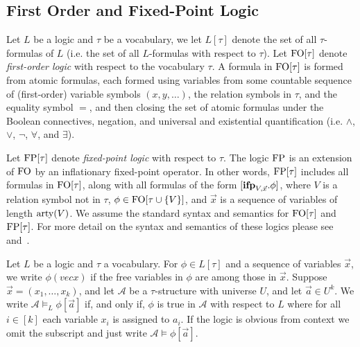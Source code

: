 \documentclass[../paper.tex]{subfiles}
\begin{document}
\subsection{First Order and Fixed-Point Logic}
Let $L$ be a logic and $\tau$ be a vocabulary, we let $L[\tau]$ denote the set
of all $\tau$-formulas of $L$ (i.e. the set of all $L$-formulas with respect to
$\tau$). Let $\text{\upshape FO}[\tau]$ denote \emph{first-order logic} with respect to the
vocabulary $\tau$. A formula in $\text{\upshape FO}[\tau]$ is formed from atomic formulas, each
formed using variables from some countable sequence of (first-order) variable
symbols $(x, y, \ldots)$, the relation symbols in $\tau$, and the equality
symbol $=$, and then closing the set of atomic formulas under the Boolean
connectives, negation, and universal and existential quantification (i.e.
$\land$, $\lor$, $\neg$, $\forall$, and $\exists$).

Let $\text{\upshape FP}[\tau]$ denote \emph{fixed-point logic} with respect to $\tau$. The
logic $\text{\upshape FP}$ is an extension of $\text{\upshape FO}$ by an inflationary fixed-point operator. In
other words, $\text{\upshape FP}[\tau]$ includes all formulas in $\text{\upshape FO}[\tau]$, along with all
formulas of the form $[\text{\textbf{ifp}}_{V, \vec{x}}. \phi]$, where $V$ is a relation symbol
not in $\tau$, $\phi \in \text{\upshape FO}[\tau \cup \{V\}]$, and $\vec{x}$ is a sequence of
variables of length $\mathrm{arty}(V)$. We assume the standard syntax and semantics for
$\text{\upshape FO}[\tau]$ and $\text{\upshape FP}[\tau]$. For more detail on the syntax and semantics of
these logics please see~\cite{grohe2017descriptive} and~\cite{GradelP15a}.

Let $L$ be a logic and $\tau$ a vocabulary. For $\phi \in L[\tau]$ and a
sequence of variables $\vec{x}$, we write $\phi(vec{x})$ if the free variables
in $\phi$ are among those in $\vec{x}$. Suppose $\vec{x} = (x_1, \ldots , x_k)$,
and let $\mathcal{A}$ be a $\tau$-structure with universe $U$, and let $\vec{a}
\in U^k$. We write $\mathcal{A} \models_L \phi[\vec{a}]$ if, and only if, $\phi$
is true in $\mathcal{A}$ with respect to $L$ where for all $i \in [k]$ each
variable $x_i$ is assigned to $a_i$. If the logic is obvious from context we
omit the subscript and just write $\mathcal{A} \models \phi[\vec{a}]$.
\end{document}
